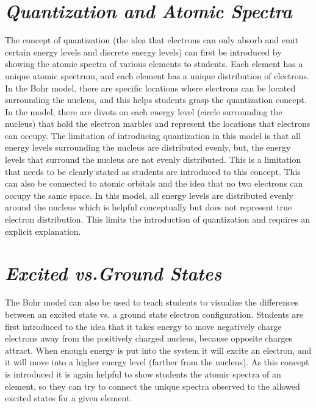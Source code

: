 \documentclass[11pt]{sig-alternate}
\begin{document}
\begin{large}
\section*{\textit{Quantization and Atomic Spectra}}
The concept of quantization (the idea that electrons can only absorb and emit certain energy levels and discrete energy levels) can first be introduced by showing the atomic spectra of various elements to students.  Each element has a unique atomic spectrum, and each element has a unique distribution of electrons.  In the Bohr model, there are specific locations where electrons can be located surrounding the nucleus, and this helps students grasp the quantization concept.  In the model, there are divots on each energy level (circle surrounding the nucleus) that hold the electron marbles and represent the locations that electrons can occupy.  The limitation of introducing quantization in this model is that all energy levels surrounding the nucleus are distributed evenly, but, the energy levels that surround the nucleus are not evenly distributed.  This is a limitation that needs to be clearly stated as students are introduced to this concept.  This can also be connected to atomic orbitals and the idea that no two electrons can occupy the same space. In this model, all energy levels are distributed evenly around the nucleus which is helpful conceptually but does not represent true electron distribution. This limits the introduction of quantization and requires an explicit explanation.

\section*{\textit{Excited vs.Ground States}}

The Bohr model can also be used to teach students to visualize the differences between an excited state vs. a ground state electron configuration. Students are first introduced to the idea that it takes energy to move negatively charge electrons away from the positively charged nucleus, because opposite charges attract.  When enough energy is put into the system it will excite an electron, and it will move into a higher energy level (farther from the nucleus).  As this concept is introduced it is again helpful to show students the atomic spectra of an element, so they can try to connect the unique spectra observed to the allowed excited states for a given element.


\end{large}
\end{document}
